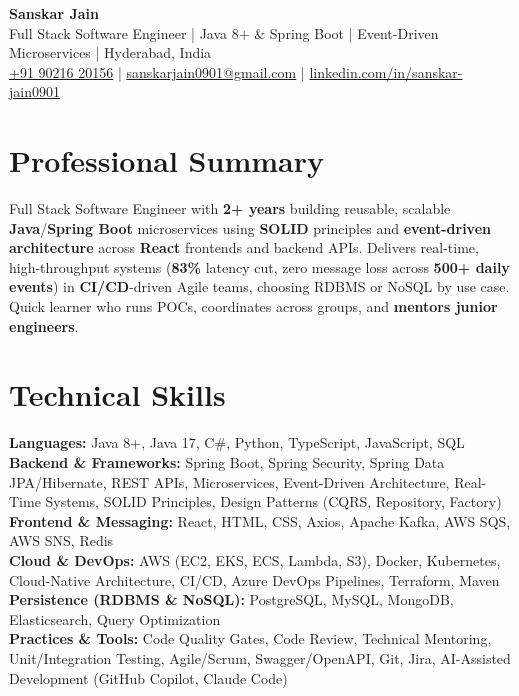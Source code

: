 \documentclass[a4paper,10pt]{article}
\begin{document}
\begin{center}
    {\LARGE \textbf{Sanskar Jain}} \\
    \vspace{2pt}
    Full Stack Software Engineer \;|\; Java 8+ \& Spring Boot \;|\; Event-Driven Microservices \;|\; Hyderabad, India \\
    \vspace{2pt}
    \href{tel:+919021620156}{+91 90216 20156} \;|\;
    \href{mailto:sanskarjain0901@gmail.com}{sanskarjain0901@gmail.com} \;|\;
    \href{https://www.linkedin.com/in/sanskar-jain0901/}{linkedin.com/in/sanskar-jain0901}
\end{center}

\section*{Professional Summary}
Full Stack Software Engineer with \textbf{2+ years} building reusable, scalable \textbf{Java}/\textbf{Spring Boot} microservices using \textbf{SOLID} principles and \textbf{event-driven architecture} across \textbf{React} frontends and backend APIs.
Delivers real-time, high-throughput systems (\textbf{83\%} latency cut, zero message loss across \textbf{500+ daily events}) in \textbf{CI/CD}-driven Agile teams, choosing RDBMS or NoSQL by use case.
Quick learner who runs POCs, coordinates across groups, and \textbf{mentors junior engineers}.

\section*{Technical Skills}
\begin{sloppypar}
\noindent
\textbf{Languages:} Java 8+, Java 17, C\#, Python, TypeScript, JavaScript, SQL \\
\textbf{Backend \& Frameworks:} Spring Boot, Spring Security, Spring Data JPA/Hibernate, REST APIs, Microservices, Event-Driven Architecture, Real-Time Systems, SOLID Principles, Design Patterns (CQRS, Repository, Factory) \\
\textbf{Frontend \& Messaging:} React, HTML, CSS, Axios, Apache Kafka, AWS SQS, AWS SNS, Redis \\
\textbf{Cloud \& DevOps:} AWS (EC2, EKS, ECS, Lambda, S3), Docker, Kubernetes, Cloud-Native Architecture, CI/CD, Azure DevOps Pipelines, Terraform, Maven \\
\textbf{Persistence (RDBMS \& NoSQL):} PostgreSQL, MySQL, MongoDB, Elasticsearch, Query Optimization \\
\textbf{Practices \& Tools:} Code Quality Gates, Code Review, Technical Mentoring, Unit/Integration Testing, Agile/Scrum, Swagger/OpenAPI, Git, Jira, AI-Assisted Development (GitHub Copilot, Claude Code)
\end{sloppypar}
\end{document}
